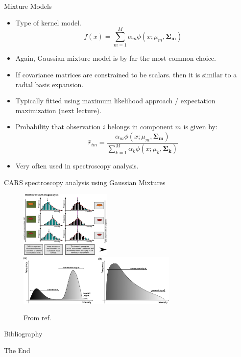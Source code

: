\documentclass{beamer}
\let \vec \mathbf
\begin{document}
\begin{frame}{Mixture Models}
    \begin{itemize}
        \item Type of kernel model.
        \begin{equation*}
            f(x) = \sum_{m=1}^M \alpha_m \phi(x; \mu_m, \vec{\Sigma_m})
        \end{equation*}
        \item Again, Gaussian mixture model is by far the most common choice.
        \item If covariance matrices are constrained to be scalars. then it is similar to a radial basis expansion.
        \item Typically fitted using maximum likelihood approach / expectation maximization (next lecture).
        \item Probability that observation $i$ belongs in component $m$ is given by:
        \begin{equation*}
            \hat{r}_{im} = \frac{\alpha_m \phi(x; \mu_m, \vec{\Sigma_m})}{\sum_{k=1}^M \alpha_k \phi(x; \mu_k, \vec{\Sigma_k})}
        \end{equation*}
        \item Very often used in spectroscopy analysis.
    \end{itemize}
\end{frame}


\begin{frame}{CARS spectroscopy analysis using Gaussian Mixtures}
\begin{figure}
    \centering
    \includegraphics[width=0.4\textwidth]{figures/cars1.jpeg}
    \includegraphics[width=0.7\textwidth]{figures/cars2.jpeg}
    \caption{From ref. \cite{voglerSeparationCARSImage2010}}
\end{figure}
\end{frame}


\begin{frame}{Bibliography}
    
    
\end{frame}




\begin{frame}
    \Huge{\centerline{The End}}
\end{frame}
\end{document}
